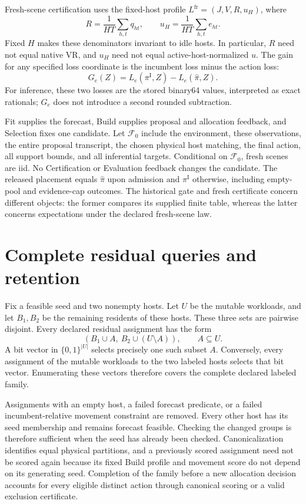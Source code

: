 \documentclass[11pt]{article}
\newcommand{\F}{\mathcal F}
\newcommand{\inc}{\pi^{\mathrm I}}
\newcommand{\act}{\widehat\pi}
\begin{document}
Fresh-scene certification uses the fixed-host profile $L^{\mathrm{fr}}=(J,V,R,u_H)$, where
\begin{equation}
 R=\frac1{HT}\sum_{h,t}q_{ht},\qquad u_H=\frac1{HT}\sum_{h,t}e_{ht}.
 \label{eq:fresh-profile}
\end{equation}
Fixed $H$ makes these denominators invariant to idle hosts. In particular, $R$ need not equal native VR, and $u_H$ need not equal active-host-normalized $u$. The gain for any specified loss coordinate is the incumbent loss minus the action loss:
\begin{equation}
 G_e(Z)=L_e(\inc,Z)-L_e(\act,Z).
\end{equation}
For inference, these two losses are the stored binary64 values, interpreted as exact rationals; $G_e$ does not introduce a second rounded subtraction.

Fit supplies the forecast, Build supplies proposal and allocation feedback, and Selection fixes one candidate. Let $\F_0$ include the environment, these observations, the entire proposal transcript, the chosen physical host matching, the final action, all support bounds, and all inferential targets. Conditional on $\F_0$, fresh scenes are iid. No Certification or Evaluation feedback changes the candidate. The released placement equals $\act$ upon admission and $\inc$ otherwise, including empty-pool and evidence-cap outcomes. The historical gate and fresh certificate concern different objects: the former compares its supplied finite table, whereas the latter concerns expectations under the declared fresh-scene law.

\section{Complete residual queries and retention}
Fix a feasible seed and two nonempty hosts. Let $U$ be the mutable workloads, and let $B_1,B_2$ be the remaining residents of these hosts. These three sets are pairwise disjoint. Every declared residual assignment has the form
\begin{equation}
 (B_1\cup A,\ B_2\cup(U\setminus A)),\qquad A\subseteq U.
 \label{eq:residual}
\end{equation}
A bit vector in $\{0,1\}^{|U|}$ selects precisely one such subset $A$. Conversely, every assignment of the mutable workloads to the two labeled hosts selects that bit vector. Enumerating these vectors therefore covers the complete declared labeled family.

Assignments with an empty host, a failed forecast predicate, or a failed incumbent-relative movement constraint are removed. Every other host has its seed membership and remains forecast feasible. Checking the changed groups is therefore sufficient when the seed has already been checked. Canonicalization identifies equal physical partitions, and a previously scored assignment need not be scored again because its fixed Build profile and movement score do not depend on its generating seed. Completion of the family before a new allocation decision accounts for every eligible distinct action through canonical scoring or a valid exclusion certificate.
\end{document}
